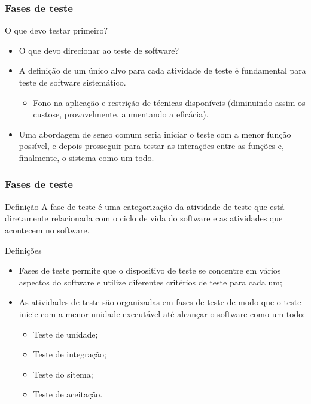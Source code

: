 \begin{frame}[parent={cmap:software-testing-foundations}, hasprev=false, hasnext=true]
\frametitle{Fases de teste}

\begin{block:fact}{O que devo testar primeiro?}
\begin{itemize}
	\item O que devo direcionar ao teste de software?

	\item A definição de um único alvo para cada atividade de teste é fundamental para teste de software sistemático.
	\begin{itemize}
		\item Fono na aplicação e restrição de técnicas disponíveis (diminuindo assim os custose, provavelmente, aumentando a eficácia).
	\end{itemize}

	\item Uma abordagem de senso comum seria iniciar o teste com a menor função possível, e depois prosseguir para testar as interações entre as funções e, finalmente, o sistema como um todo.
\end{itemize}
\end{block:fact}
\end{frame}


\begin{frame}[hasprev=true, hasnext=true]
\frametitle{Fases de teste}
\label{concept:fase-de-teste}
\label{concept:fase}

\begin{block:concept}{Definição}
A fase de teste é uma categorização da atividade de teste que está diretamente relacionada com o ciclo de vida do software e as atividades que acontecem no software.
\end{block:concept}

\begin{block:fact}{Definições}
\begin{itemize}
	\item Fases de teste permite que o dispositivo de teste se concentre em vários aspectos do software e utilize diferentes critérios de teste para cada um;

	\item As atividades de teste são organizadas em fases de teste de modo que o teste inicie com a menor unidade executável até alcançar o software como um todo:
	\begin{itemize}
		\item Teste de unidade;
		\item Teste de integração;
		\item Teste do sitema;
		\item Teste de aceitação.
	\end{itemize}
\end{itemize}
\end{block:fact}
\end{frame}


